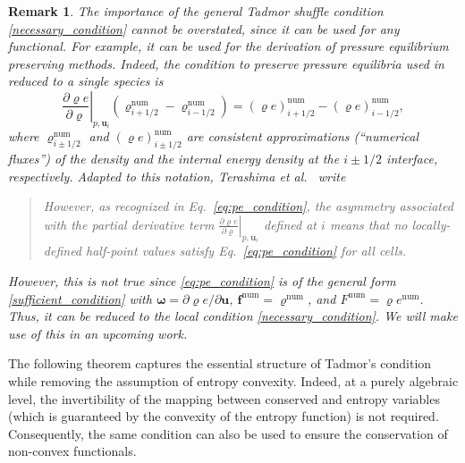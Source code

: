 \documentclass[]{scrartcl}
\renewcommand{\vec}[1]{\boldsymbol{#1}}
\newtheorem{remark}[theorem]{Remark}
\theoremstyle{definition}
\begin{document}
\begin{remark}
    The importance of the general Tadmor shuffle condition \eqref{necessary_condition} cannot be overstated, since it can be used for any functional.
    For example, it can be used for the derivation of pressure equilibrium preserving methods.
    Indeed, the condition to preserve pressure equilibria used in \cite{terashima2025approximately,fujiwara2023fully} reduced to a single species is
    \begin{equation}
        \left. \frac{\partial \varrho e}{\partial \varrho} \right|_{p, \bm{u}_i}
        ( \varrho^\mathrm{num}_{i + 1/2} - \varrho^\mathrm{num}_{i - 1/2} )
        =
        (\varrho e)^\mathrm{num}_{i + 1/2} - (\varrho e)^\mathrm{num}_{i - 1/2},
    \label{eq:pe_condition}
    \end{equation}
    where $\varrho^\mathrm{num}_{i \pm 1/2}$ and $(\varrho e)^\mathrm{num}_{i \pm 1/2}$ are consistent approximations (``numerical fluxes'') of the density and the internal energy density at the $i \pm 1/2$ interface, respectively.
    Adapted to this notation, Terashima et al.~\cite{terashima2025approximately} write
    \begin{quote}
        However, as recognized in Eq.~\eqref{eq:pe_condition}, the
        asymmetry associated with the partial derivative term
        $\left. \frac{\partial \varrho e}{\partial \varrho} \right|_{p, \bm{u}_i}$
        defined at $i$ means that no locally-defined half-point values
        satisfy Eq.~\eqref{eq:pe_condition} for all cells.
    \end{quote}
    However, this is not true since \eqref{eq:pe_condition} is of the general form \eqref{sufficient_condition} with $\vec{\omega} = \partial \varrho e / \partial \vec{u}$, $\vec{f}^\mathrm{num} = \varrho^\mathrm{num}$, and $F^\mathrm{num} = \varrho e^\mathrm{num}$.
    Thus, it can be reduced to the local condition \eqref{necessary_condition}.
    We will make use of this in an upcoming work.
\end{remark}

The following theorem captures the essential structure of Tadmor's condition while removing the assumption of entropy convexity.
Indeed, at a purely algebraic level, the invertibility of the mapping between conserved and entropy variables (which is guaranteed by the convexity of the entropy function) is not required.
Consequently, the same condition can also be used to ensure the conservation of non-convex functionals.
\end{document}
